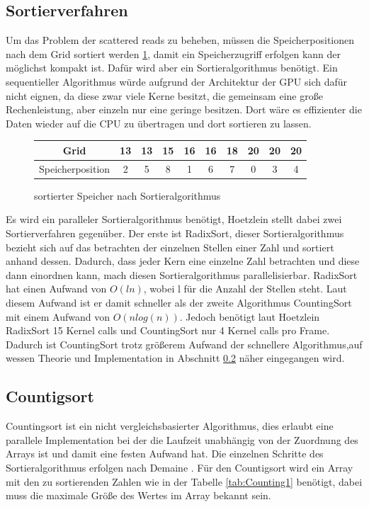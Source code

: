 \documentclass[intern,palatino]{cgBA}
\begin{document}
\subsection{Sortierverfahren}\label{sortieren}
Um das Problem der scattered reads zu beheben, müssen die Speicherpositionen nach dem Grid sortiert werden \ref{tab:Speichersorted}, damit ein Speicherzugriff erfolgen kann der möglichst kompakt ist. Dafür wird aber ein Sortieralgorithmus benötigt. Ein sequentieller Algorithmus würde aufgrund der Architektur der GPU sich dafür nicht eignen, da diese zwar viele Kerne besitzt, die gemeinsam eine große Rechenleistung, aber einzeln nur eine geringe besitzen. Dort wäre es effizienter die Daten wieder auf die CPU zu übertragen und dort sortieren zu lassen.
\begin{figure}[H]
	\centering
	\begin{tabular}{ | c || c | c | c | c | c | c | c | c | c |}
		\hline
		Grid 				&  13 & 13 & 15 & 16 & 16 & 18 & 20 & 20 & 20	\\ \hline
		Speicherposition	&   2 &  5 &  8 &  1 &  6 &  7 &  0 &  3 &  4	\\
		\hline
	\end{tabular}
	\caption{sortierter Speicher nach Sortieralgorithmus}
	\label{tab:Speichersorted}
\end{figure}
Es wird ein paralleler Sortieralgorithmus benötigt, Hoetzlein \cite{nvidia} stellt dabei zwei Sortierverfahren gegenüber. Der erste ist RadixSort, dieser Sortieralgorithmus bezieht sich auf das betrachten der einzelnen Stellen einer Zahl und sortiert anhand dessen. Dadurch, dass jeder Kern eine einzelne Zahl betrachten und diese dann einordnen kann, mach diesen Sortieralgorithmus parallelisierbar.
RadixSort hat einen Aufwand von $O(l n)$, wobei l für die Anzahl der Stellen steht. Laut diesem Aufwand ist er damit schneller als der zweite Algorithmus CountingSort mit einem Aufwand von $O(n log(n))$. Jedoch benötigt laut Hoetzlein \cite{nvidia} RadixSort 15 Kernel calls und CountingSort nur 4 Kernel calls pro Frame. Dadurch ist CountingSort trotz größerem Aufwand der schnellere Algorithmus,auf wessen Theorie und Implementation in Abschnitt \ref{counting}  näher eingegangen wird.


\subsection{Countigsort}\label{counting}
Countingsort ist ein nicht vergleichsbasierter Algorithmus, dies erlaubt eine parallele Implementation bei der die Laufzeit unabhängig von der Zuordnung des Arrays ist und damit eine festen Aufwand hat.
Die einzelnen Schritte des Sortieralgorithmus erfolgen nach Demaine \cite{counting}.
\newline
Für den Countigsort wird ein Array mit den zu sortierenden Zahlen wie in der Tabelle \ref{tab:Counting1} benötigt, dabei muss die maximale Größe des Wertes im Array bekannt sein.
\newline
\end{document}
